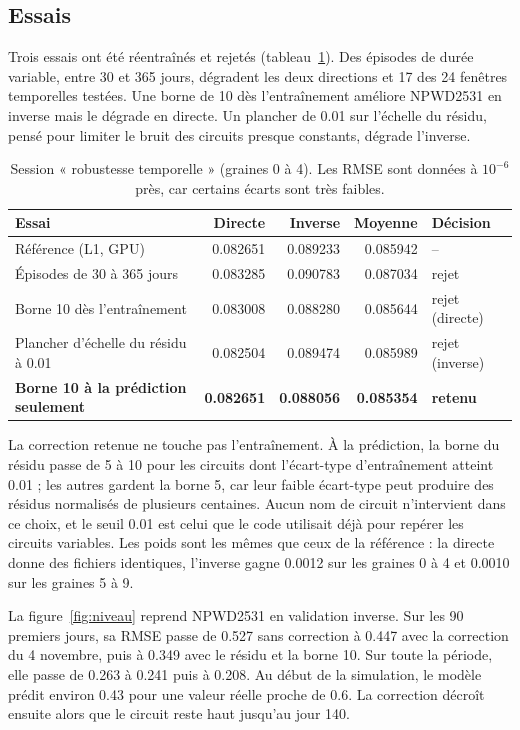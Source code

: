 \documentclass[11pt,a4paper]{article}
\begin{document}
\subsection{Essais}

Trois essais ont été réentraînés et rejetés (tableau~\ref{tab:robustesse}). Des épisodes de durée variable, entre 30 et 365 jours, dégradent les deux directions et 17 des 24 fenêtres temporelles testées. Une borne de 10 dès l'entraînement améliore NPWD2531 en inverse mais le dégrade en directe. Un plancher de 0.01 sur l'échelle du résidu, pensé pour limiter le bruit des circuits presque constants, dégrade l'inverse.

\begin{table}[!htb]
\centering\small
\caption{Session « robustesse temporelle » (graines 0 à 4). Les RMSE sont données à $10^{-6}$ près, car certains écarts sont très faibles.}
\label{tab:robustesse}
\begin{tabularx}{\linewidth}{X r r r l}
\toprule
Essai & Directe & Inverse & Moyenne & Décision \\
\midrule
Référence (L1, GPU) & 0.082651 & 0.089233 & 0.085942 & -- \\
Épisodes de 30 à 365 jours & 0.083285 & 0.090783 & 0.087034 & rejet \\
Borne 10 dès l'entraînement & 0.083008 & 0.088280 & 0.085644 & rejet (directe) \\
Plancher d'échelle du résidu à 0.01 & 0.082504 & 0.089474 & 0.085989 & rejet (inverse) \\
\rowcolor{fond} \textbf{Borne 10 à la prédiction seulement} & \textbf{0.082651} & \textbf{0.088056} & \textbf{0.085354} & \textbf{retenu} \\
\bottomrule
\end{tabularx}
\end{table}

La correction retenue ne touche pas l'entraînement. À la prédiction, la borne du résidu passe de 5 à 10 pour les circuits dont l'écart-type d'entraînement atteint 0.01 ; les autres gardent la borne 5, car leur faible écart-type peut produire des résidus normalisés de plusieurs centaines. Aucun nom de circuit n'intervient dans ce choix, et le seuil 0.01 est celui que le code utilisait déjà pour repérer les circuits variables. Les poids sont les mêmes que ceux de la référence : la directe donne des fichiers identiques, l'inverse gagne 0.0012 sur les graines 0 à 4 et 0.0010 sur les graines 5 à 9.

La figure~\ref{fig:niveau} reprend NPWD2531 en validation inverse. Sur les 90 premiers jours, sa RMSE passe de 0.527 sans correction à 0.447 avec la correction du 4 novembre, puis à 0.349 avec le résidu et la borne 10. Sur toute la période, elle passe de 0.263 à 0.241 puis à 0.208. Au début de la simulation, le modèle prédit environ 0.43 pour une valeur réelle proche de 0.6. La correction décroît ensuite alors que le circuit reste haut jusqu'au jour 140.
\end{document}
